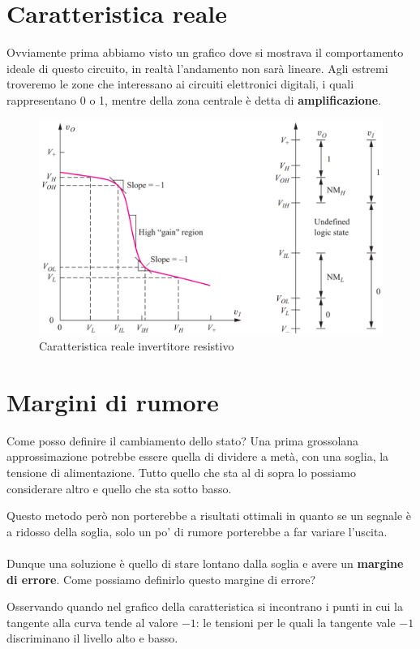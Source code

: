 \section{Caratteristica reale}
Ovviamente prima abbiamo visto un grafico dove si mostrava il comportamento ideale di questo circuito, in realtà l'andamento non sarà lineare. Agli estremi troveremo le zone che interessano ai circuiti elettronici digitali, i quali rappresentano 0 o 1, mentre della zona centrale è detta di \textbf{amplificazione}.

\begin{figure}[htbp]
    \centering
    \includegraphics[width=0.75\linewidth]{img/grafico_invert_resist.png}
    \caption{Caratteristica reale invertitore resistivo}    
\end{figure}


\newpage
\section{Margini di rumore}

Come posso definire il cambiamento dello stato? Una prima grossolana approssimazione potrebbe essere quella di dividere a metà, con una soglia, la tensione di alimentazione. Tutto quello che sta al di sopra lo possiamo considerare altro e quello che sta sotto basso.

Questo metodo però non porterebbe a risultati ottimali in quanto se un segnale è a ridosso della soglia, solo un po' di rumore porterebbe a far variare l'uscita.

\paragraph{}
Dunque una soluzione è quello di stare lontano dalla soglia e avere un\textbf{ margine di errore}. Come possiamo definirlo questo margine di errore?

Osservando quando nel grafico della caratteristica si incontrano i punti in cui la tangente alla curva tende al valore $-1$: le	tensioni	per	le	quali	la	tangente	vale	$-1$ discriminano	il	livello	alto	e	basso.

